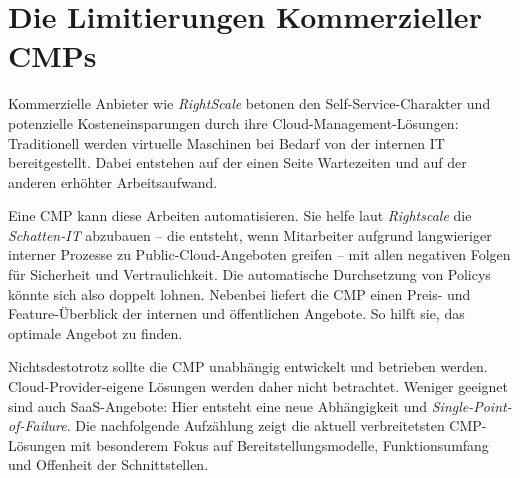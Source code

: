\section{Die Limitierungen Kommerzieller CMPs}

Kommerzielle Anbieter wie \emph{RightScale} betonen den Self-Service-Charakter und potenzielle Kosteneinsparungen durch ihre Cloud-Management-Lösungen: Traditionell werden virtuelle Maschinen bei Bedarf von der internen IT bereitgestellt. Dabei entstehen auf der einen Seite Wartezeiten und auf der anderen erhöhter Arbeitsaufwand.

Eine CMP kann diese Arbeiten automatisieren. Sie helfe laut \emph{Rightscale} die \emph{Schatten-IT} abzubauen -- die entsteht, wenn Mitarbeiter aufgrund langwieriger interner Prozesse zu Public-Cloud-Angeboten greifen -- mit allen negativen Folgen für Sicherheit und Vertraulichkeit. Die automatische Durchsetzung von Policys könnte sich also doppelt lohnen. Nebenbei liefert die CMP einen Preis- und Feature-Überblick der internen und öffentlichen Angebote. So hilft sie, das optimale Angebot zu finden.

Nichtsdestotrotz sollte die CMP unabhängig entwickelt und betrieben werden. Cloud-Provider-eigene Lösungen werden daher nicht betrachtet. Weniger geeignet sind auch SaaS-Angebote: Hier entsteht eine neue Abhängigkeit und \emph{Single-Point-of-Failure}. Die nachfolgende Aufzählung zeigt die aktuell verbreitetsten CMP-Lösungen mit besonderem Fokus auf Bereitstellungsmodelle, Funktionsumfang und Offenheit der Schnittstellen.



